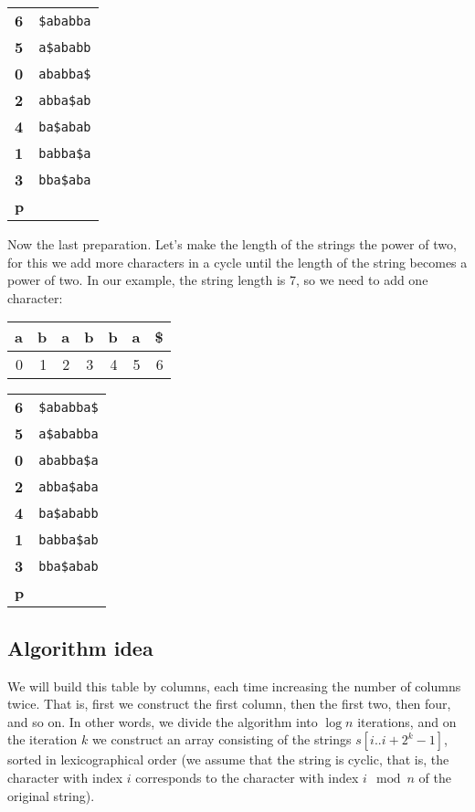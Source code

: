 \documentclass[11pt]{article}
\begin{document}
\begin{center}
\begin{tabular}{ll}
\textbf{6} & \texttt{\$ababba}\\
\textbf{5} & \texttt{a\$ababb}\\
\textbf{0} & \texttt{ababba\$}\\
\textbf{2} & \texttt{abba\$ab}\\
\textbf{4} & \texttt{ba\$abab}\\
\textbf{1} & \texttt{babba\$a}\\
\textbf{3} & \texttt{bba\$aba}\\
\textbf{p} & \\
\end{tabular}
\end{center}

Now the last preparation. Let's make the length of the strings the power of two, for this we add
more characters in a cycle until the length of the string becomes a power of two. In our example,
the string length is 7, so we need to add one character:
\begin{center}
\begin{tabular}{rrrrrrr}
\textbf{a} & \textbf{b} & \textbf{a} & \textbf{b} & \textbf{b} & \textbf{a} & \textbf{\$}\\
\hline
0 & 1 & 2 & 3 & 4 & 5 & 6\\
\end{tabular}
\end{center}

\begin{center}
\begin{tabular}{ll}
\textbf{6} & \texttt{\$ababba\$}\\
\textbf{5} & \texttt{a\$ababba}\\
\textbf{0} & \texttt{ababba\$a}\\
\textbf{2} & \texttt{abba\$aba}\\
\textbf{4} & \texttt{ba\$ababb}\\
\textbf{1} & \texttt{babba\$ab}\\
\textbf{3} & \texttt{bba\$abab}\\
\textbf{p} & \\
\end{tabular}
\end{center}

\subsection{Algorithm idea}
\label{sec:orgb3bcb1d}
We will build this table by columns, each time increasing the number of columns twice. That is,
first we construct the first column, then the first two, then four, and so on. In other words, we
divide the algorithm into \(\log n\) iterations, and on the iteration \(k\) we construct an array
consisting of the strings \(s[i..i + 2^k - 1]\), sorted in lexicographical order (we assume that
the string is cyclic, that is, the character with index \(i\) corresponds to the character with
index \(i \mod n\) of the original string).
\end{document}
